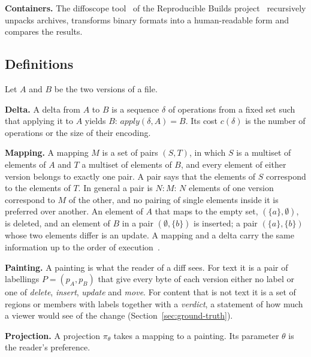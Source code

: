 \documentclass[sigconf,review]{acmart}
\begin{document}
\textbf{Containers.} The diffoscope tool~\cite{diffoscope} of the Reproducible Builds
project~\cite{lamb-reproducible-2022} recursively unpacks archives, transforms binary formats
into a human-readable form and compares the results.

\subsection{Definitions}
\label{sec:definitions}

Let $A$ and $B$ be the two versions of a file.

\textbf{Delta.} A delta from $A$ to $B$ is a sequence $\delta$ of operations from a fixed set
such that applying it to $A$ yields $B$: $\mathit{apply}(\delta, A) = B$. Its cost $c(\delta)$ is the number of
operations or the size of their encoding.

\textbf{Mapping.} A mapping $M$ is a set of pairs $(S, T)$, in which $S$ is a multiset of
elements of $A$ and $T$ a multiset of elements of $B$, and every element of either version
belongs to exactly one pair. A pair says that the elements of $S$ correspond to the elements of
$T$. In general a pair is $N{:}M$: $N$ elements of one version correspond to $M$ of the other,
and no pairing of single elements inside it is preferred over another. An element of $A$ that
maps to the empty set, $(\{a\}, \emptyset)$, is deleted, and an element of $B$ in a pair
$(\emptyset, \{b\})$ is inserted; a pair $(\{a\}, \{b\})$ whose two elements differ is an
update. A mapping and a delta carry the same information up to the order of
execution~\cite{chawathe-1996}.

\textbf{Painting.} A painting is what the reader of a diff sees. For text it is a pair of
labellings $P = (p_A, p_B)$ that give every byte of each version either no label or one of
\emph{delete}, \emph{insert}, \emph{update} and \emph{move}. For content that is not text it is a
set of regions or members with labels together with a \emph{verdict}, a statement of how much a viewer would see of the
change (Section~\ref{sec:ground-truth}).

\textbf{Projection.} A projection $\pi_\theta$ takes a mapping to a painting. Its parameter
$\theta$ is the reader's preference.
\end{document}

